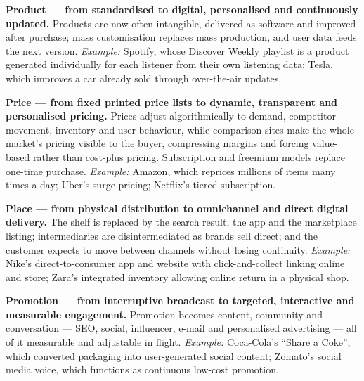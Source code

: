 \begin{qlist}
\begin{apts}
\item \textbf{Product --- from standardised to digital, personalised and
      continuously updated.} Products are now often intangible, delivered as
      software and improved after purchase; mass customisation replaces mass
      production, and user data feeds the next version.
      \emph{Example:} Spotify, whose Discover Weekly playlist is a product
      generated individually for each listener from their own listening data;
      Tesla, which improves a car already sold through over-the-air updates.
\item \textbf{Price --- from fixed printed price lists to dynamic, transparent
      and personalised pricing.} Prices adjust algorithmically to demand,
      competitor movement, inventory and user behaviour, while comparison sites
      make the whole market's pricing visible to the buyer, compressing margins
      and forcing value-based rather than cost-plus pricing. Subscription and
      freemium models replace one-time purchase.
      \emph{Example:} Amazon, which reprices millions of items many times a day;
      Uber's surge pricing; Netflix's tiered subscription.
\item \textbf{Place --- from physical distribution to omnichannel and direct
      digital delivery.} The shelf is replaced by the search result, the app and
      the marketplace listing; intermediaries are disintermediated as brands sell
      direct; and the customer expects to move between channels without losing
      continuity.
      \emph{Example:} Nike's direct-to-consumer app and website with
      click-and-collect linking online and store; Zara's integrated inventory
      allowing online return in a physical shop.
\item \textbf{Promotion --- from interruptive broadcast to targeted, interactive
      and measurable engagement.} Promotion becomes content, community and
      conversation --- SEO, social, influencer, e-mail and personalised
      advertising --- all of it measurable and adjustable in flight.
      \emph{Example:} Coca-Cola's ``Share a Coke'', which converted packaging
      into user-generated social content; Zomato's social media voice, which
      functions as continuous low-cost promotion.
\end{apts}


\end{qlist}
